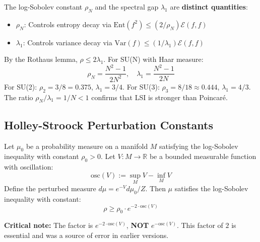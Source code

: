 \begin{remark}
\label{rem:lsi-vs-spectral}
The log-Sobolev constant $\rho_N$ and the spectral gap $\lambda_1$ are \textbf{distinct quantities}:
\begin{itemize}
\item $\rho_N$: Controls entropy decay via $\mathrm{Ent}(f^2) \leq (2/\rho_N)\mathcal{E}(f,f)$
\item $\lambda_1$: Controls variance decay via $\mathrm{Var}(f) \leq (1/\lambda_1)\mathcal{E}(f,f)$
\end{itemize}
By the Rothaus lemma, $\rho \leq 2\lambda_1$. For SU(N) with Haar measure:
\[
\boxed{\rho_N = \frac{N^2-1}{2N^2}}, \quad \lambda_1 = \frac{N^2-1}{2N}
\]
For SU(2): $\rho_2 = 3/8 = 0.375$, $\lambda_1 = 3/4$. For SU(3): $\rho_3 = 8/18 \approx 0.444$, $\lambda_1 = 4/3$.
The ratio $\rho_N/\lambda_1 = 1/N < 1$ confirms that LSI is stronger than Poincaré.
\end{remark}

\subsection{Holley-Stroock Perturbation Constants}

\begin{theorem}
\label{thm:holley-stroock-explicit}
Let $\mu_0$ be a probability measure on a manifold $M$ satisfying the log-Sobolev 
inequality with constant $\rho_0 > 0$. Let $V: M \to \mathbb{R}$ be a bounded 
measurable function with oscillation:
\[
\mathrm{osc}(V) := \sup_M V - \inf_M V
\]
Define the perturbed measure $d\mu = e^{-V} d\mu_0 / Z$. Then $\mu$ satisfies 
the log-Sobolev inequality with constant:
\[
\boxed{\rho \geq \rho_0 \cdot e^{-2 \cdot \mathrm{osc}(V)}}
\]

\textbf{Critical note:} The factor is $e^{-2 \cdot \mathrm{osc}(V)}$, \textbf{NOT} 
$e^{-\mathrm{osc}(V)}$. This factor of $2$ is essential and was a source of 
error in earlier versions.
\end{theorem}

